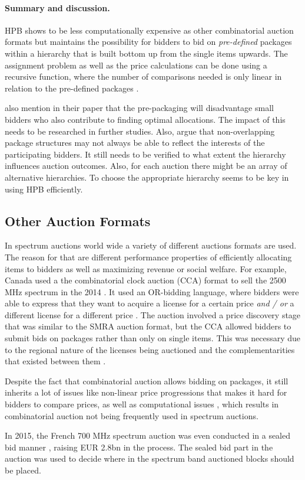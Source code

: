 
\paragraph{Summary and discussion.}
HPB shows to be less computationally expensive as other combinatorial auction formats but maintains the possibility for bidders to bid on \textit{pre-defined} packages within a hierarchy that is built bottom up from the single items upwards. The assignment problem as well as the price calculations can be done using a recursive function, where the number of comparisons needed is only linear in relation to the pre-defined packages \cite{Goeree2010}. 

\citeauthor{Goeree2010} also mention in their paper that the pre-packaging will disadvantage small bidders who also contribute to finding optimal allocations. The impact of this needs to be researched in further studies. Also, \citeauthor{Goeree2010} argue that non-overlapping package structures may not always be able to reflect the interests of the participating bidders. It still needs to be verified to what extent the hierarchy influences auction outcomes. Also, for each auction there might be an array of alternative hierarchies. To choose the appropriate hierarchy seems to be key in using HPB efficiently.

\subsection{Other Auction Formats}
In spectrum auctions world wide a variety of different auctions formats are used. The reason for that are different performance properties of efficiently allocating items to bidders as well as maximizing revenue or social welfare. 
For example, Canada used a the combinatorial clock auction (CCA) format to sell the 2500 MHz spectrum in the 2014 . It used an OR-bidding language, where bidders were able to express that they want to acquire a license for a certain price \textit{and / or} a different license for a different price \cite{FCCCanada}. The auction involved a price discovery stage that was similar to the SMRA auction format, but the CCA allowed bidders to submit bids on packages rather than only on single items. This was necessary due to the regional nature of the licenses being auctioned and the complementarities that existed between them \cite{FCCCanada}.

Despite the fact that combinatorial auction allows bidding on packages, it still inherits a lot of issues like non-linear price progressions that makes it hard for bidders to compare prices, as well as computational issues \cite[p. 290]{Nisan2007}, which results in combinatorial auction not being frequently used in spectrum auctions.

In 2015, the French 700 MHz spectrum auction was even conducted in a sealed bid manner \cite{FranceSealed2015}, raising EUR 2.8bn in the process. The sealed bid part in the auction was used to decide where in the spectrum band auctioned blocks should be placed.